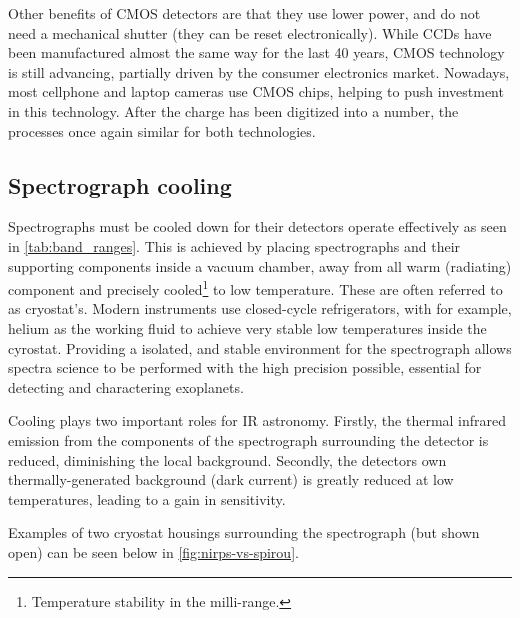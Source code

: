 Other benefits of {CMOS} detectors are that they use lower power, and do not need a mechanical shutter (they can be reset electronically).
While {CCDs} have been manufactured almost the same way for the last 40 years, {CMOS} technology is still advancing, partially driven by the consumer electronics market.
Nowadays, most cellphone and laptop cameras use {CMOS} chips, helping to push investment in this technology.
After the charge has been digitized into a number, the processes once again similar for both technologies.

\subsection{Spectrograph cooling}
\label{subsec:cold_spectrogrpah}
Spectrographs must be cooled down for their detectors operate effectively as seen in \cref{tab:band_ranges}.
This is achieved by placing spectrographs and their supporting components inside a vacuum chamber, away from all warm (radiating) component and precisely cooled\footnote{Temperature stability in the milli-\K range.} to low temperature.
These are often referred to as cryostat's.
Modern instruments use closed-cycle refrigerators, with for example, helium as the working fluid to achieve very stable low temperatures inside the cyrostat.
Providing a isolated, and stable environment for the spectrograph allows spectra science to be performed with the high precision possible, essential for detecting and charactering exoplanets.

Cooling plays two important roles for {IR} astronomy.
Firstly, the thermal infrared emission from the components of the spectrograph surrounding the detector is reduced, diminishing the local background.
Secondly, the detectors own thermally-generated background (dark current) is greatly reduced at low temperatures, leading to a gain in sensitivity.

Examples of two cryostat housings surrounding the spectrograph (but shown open) can be seen below in \cref{fig:nirps-vs-spirou}.


